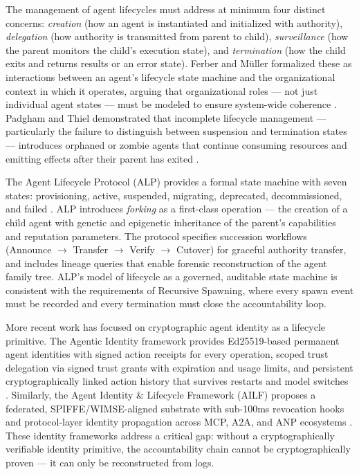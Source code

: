 The management of agent lifecycles must address at minimum four distinct concerns: \emph{creation} (how an agent is instantiated and initialized with authority), \emph{delegation} (how authority is transmitted from parent to child), \emph{surveillance} (how the parent monitors the child's execution state), and \emph{termination} (how the child exits and returns results or an error state). Ferber and Müller formalized these as interactions between an agent's lifecycle state machine and the organizational context in which it operates, arguing that organizational roles — not just individual agent states — must be modeled to ensure system-wide coherence \cite{ferber1996}. Padgham and Thiel demonstrated that incomplete lifecycle management — particularly the failure to distinguish between suspension and termination states — introduces orphaned or zombie agents that continue consuming resources and emitting effects after their parent has exited \cite{padgham2001}.

The Agent Lifecycle Protocol (ALP) provides a formal state machine with seven states: provisioning, active, suspended, migrating, deprecated, decommissioned, and failed \cite{agent-lifecycle-protocol2025}. ALP introduces \emph{forking} as a first-class operation — the creation of a child agent with genetic and epigenetic inheritance of the parent's capabilities and reputation parameters. The protocol specifies succession workflows (Announce $\rightarrow$ Transfer $\rightarrow$ Verify $\rightarrow$ Cutover) for graceful authority transfer, and includes lineage queries that enable forensic reconstruction of the agent family tree. ALP's model of lifecycle as a governed, auditable state machine is consistent with the requirements of Recursive Spawning, where every spawn event must be recorded and every termination must close the accountability loop.

More recent work has focused on cryptographic agent identity as a lifecycle primitive. The Agentic Identity framework provides Ed25519-based permanent agent identities with signed action receipts for every operation, scoped trust delegation via signed trust grants with expiration and usage limits, and persistent cryptographically linked action history that survives restarts and model switches \cite{agentic-identity2025}. Similarly, the Agent Identity \& Lifecycle Framework (AILF) proposes a federated, SPIFFE/WIMSE-aligned substrate with sub-100ms revocation hooks and protocol-layer identity propagation across MCP, A2A, and ANP ecosystems \cite{ailf2025}. These identity frameworks address a critical gap: without a cryptographically verifiable identity primitive, the accountability chain cannot be cryptographically proven — it can only be reconstructed from logs.


